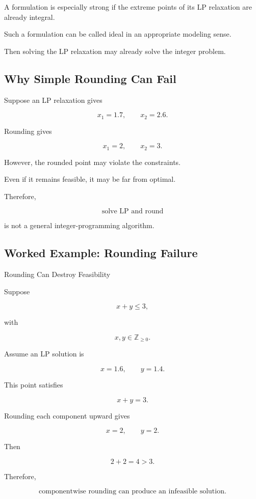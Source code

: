 A formulation is especially strong if the extreme points of its LP
relaxation are already integral.

Such a formulation can be called ideal in an appropriate modeling sense.

Then solving the LP relaxation may already solve the integer problem.

\subsection{Why Simple Rounding Can Fail}
\label{subsec:why-rounding-can-fail}

Suppose an LP relaxation gives

\[
x_1=1.7,
\qquad
x_2=2.6.
\]

Rounding gives

\[
x_1=2,
\qquad
x_2=3.
\]

However, the rounded point may violate the constraints.

Even if it remains feasible, it may be far from optimal.

Therefore,

\[
\boxed{
\text{solve LP and round}
}
\]

is not a general integer-programming algorithm.

\subsection{Worked Example: Rounding Failure}
\label{subsec:worked-rounding-failure}

\begin{workedexamplebox}{Rounding Can Destroy Feasibility}

Suppose

\[
x+y\leq3,
\]

with

\[
x,y\in\mathbb{Z}_{\geq0}.
\]

Assume an LP solution is

\[
x=1.6,
\qquad
y=1.4.
\]

This point satisfies

\[
x+y=3.
\]

Rounding each component upward gives

\[
x=2,
\qquad
y=2.
\]

Then

\[
2+2=4>3.
\]

Therefore,

\begin{answerbox}
\[
\boxed{
\text{componentwise rounding can produce an infeasible solution}.
}
\]
\end{answerbox}

\end{workedexamplebox}

